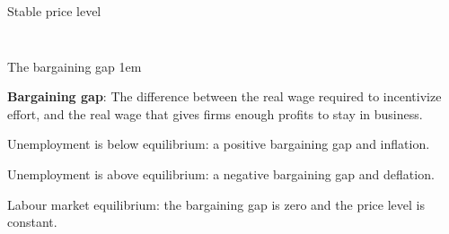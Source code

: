 \documentclass[11pt,aspectratio=43,usenames,dvipsnames]{beamer}
\let\olditemize=\itemize
\let\endolditemize=\enditemize
\renewenvironment{itemize}{\olditemize \itemsep1em}{\endolditemize}
\theoremstyle{definition}
\begin{document}
\begin{frame}{Stable price level}
\begin{columns}
\begin{column}{0.7\textwidth}
\begin{figure}
{                }
            \end{figure}

        \end{column}
    \end{columns}

\end{frame}

\begin{frame}{The bargaining gap}
\label{slide:The_bargaining_gap}
    \begin{itemize}
        \item \textbf{Bargaining gap}: The difference between the real wage required to incentivize effort, and the real wage that gives firms enough profits to stay in business.
        \item Unemployment is below equilibrium: a positive bargaining gap and inflation.
        \item Unemployment is above equilibrium: a negative bargaining gap and deflation.
        \item Labour market equilibrium: the bargaining gap is zero and the price level is constant.
    \end{itemize}
\end{frame}
\end{document}
